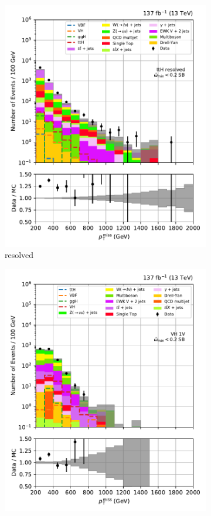 \begin{figure}[htbp]
\begin{subfigure}[b]{0.24\textwidth}
        \includegraphics[width=\textwidth]{figures/region_plots/full_Run2/sideband_3/ttH_resolved.pdf}
        \caption{\ttH resolved}
    \end{subfigure}
    \hfill
    \begin{subfigure}[b]{0.24\textwidth}
        \includegraphics[width=\textwidth]{figures/region_plots/full_Run2/sideband_3/VH_1V.pdf}

\end{subfigure}
\end{figure}
